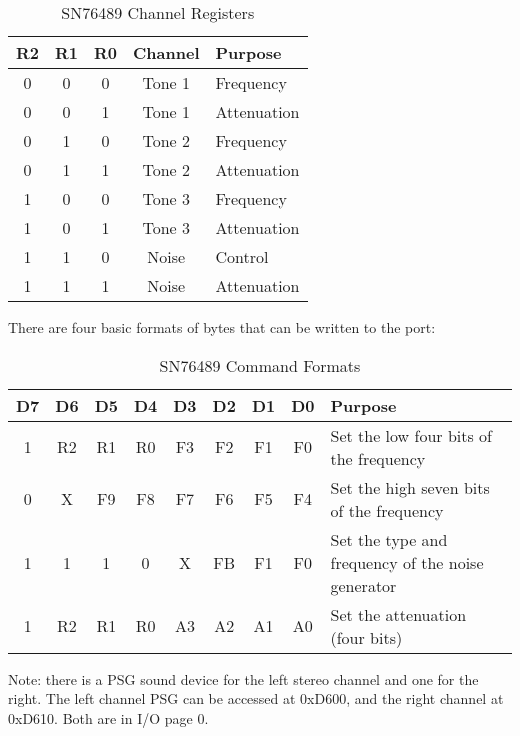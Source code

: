 \begin{table}
	\begin{center}
		\begin{tabular}{|c|c|c|c|l|} \hline
			R2 & R1 & R0 & Channel & Purpose \\ \hline \hline
			0 & 0 & 0 & Tone 1 & Frequency \\ \hline
			0 & 0 & 1 & Tone 1 & Attenuation \\ \hline
			0 & 1 & 0 & Tone 2 & Frequency \\ \hline
			0 & 1 & 1 & Tone 2 & Attenuation \\ \hline
			1 & 0 & 0 & Tone 3 & Frequency \\ \hline
			1 & 0 & 1 & Tone 3 & Attenuation \\ \hline
			1 & 1 & 0 & Noise & Control \\ \hline
			1 & 1 & 1 & Noise & Attenuation \\ \hline
		\end{tabular}
		\caption{SN76489 Channel Registers}
	\end{center}
	\label{tab:psg_registers}
\end{table}

There are four basic formats of bytes that can be written to the port:

\begin{table}
	\begin{center}
		\begin{tabular}{|c|c|c|c|c|c|c|c|l|} \hline
			D7 & D6 & D5 & D4 & D3 & D2 & D1 & D0 & Purpose \\ \hline \hline
			1 & R2 & R1 & R0 & F3 & F2 & F1 & F0 & Set the low four bits of the frequency \\ \hline
			0 & X & F9 & F8 & F7 & F6 & F5 & F4 & Set the high seven bits of the frequency \\ \hline
			1 & 1 & 1 & 0 & X & FB & F1 & F0 & Set the type and frequency of the noise generator \\ \hline
			1 & R2 & R1 & R0 & A3 & A2 & A1 & A0 & Set the attenuation (four bits) \\ \hline
		\end{tabular}
		\caption{SN76489 Command Formats}
	\end{center}
	\label{tab:psg_commands}
\end{table}

Note: there is a PSG sound device for the left stereo channel and one for the right. The left channel PSG can be accessed at 0xD600, and the right channel at 0xD610. Both are in I/O page 0.

